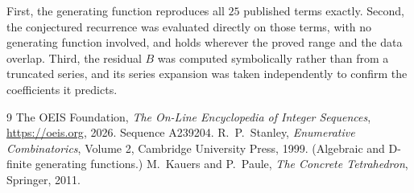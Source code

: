\documentclass[11pt,a4paper]{article}
\theoremstyle{plain}
\theoremstyle{definition}
\begin{document}
First, the generating function reproduces all $25$ published terms exactly. Second,
the conjectured recurrence was evaluated directly on those terms, with no generating function
involved, and holds wherever the proved range and the data overlap. Third, the residual $B$ was
computed symbolically rather than from a truncated series, and its series expansion was taken
independently to confirm the coefficients it predicts.

\begin{thebibliography}{9}
 The OEIS Foundation, \emph{The On-Line Encyclopedia of Integer Sequences},
\url{https://oeis.org}, 2026. Sequence A239204.
 R.~P.~Stanley, \emph{Enumerative Combinatorics}, Volume 2, Cambridge
University Press, 1999. (Algebraic and D-finite generating functions.)
 M.~Kauers and P.~Paule, \emph{The Concrete Tetrahedron}, Springer, 2011.
\end{thebibliography}
\end{document}
